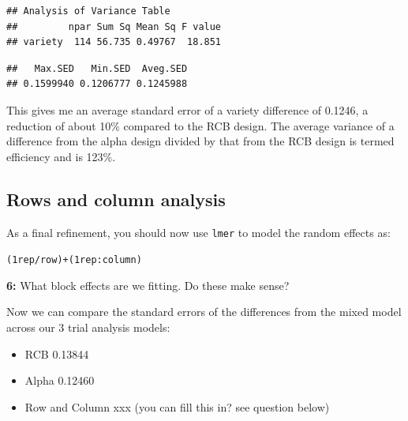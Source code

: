 \documentclass[
]{book}
\makeatletter
\newenvironment{Shaded}{\begin{snugshade}}{\end{snugshade}}
\newcommand{\AttributeTok}[1]{\textcolor[rgb]{0.77,0.63,0.00}{#1}}
\newcommand{\FunctionTok}[1]{\textcolor[rgb]{0.00,0.00,0.00}{#1}}
\newcommand{\NormalTok}[1]{#1}
\newcommand{\OtherTok}[1]{\textcolor[rgb]{0.56,0.35,0.01}{#1}}
\newcommand{\SpecialCharTok}[1]{\textcolor[rgb]{0.00,0.00,0.00}{#1}}
\newcommand{\StringTok}[1]{\textcolor[rgb]{0.31,0.60,0.02}{#1}}
\providecommand{\tightlist}{%
  \setlength{\itemsep}{0pt}\setlength{\parskip}{0pt}}
\newenvironment{kframe}{%
\medskip{}
\setlength{\fboxsep}{.8em}
 \def\at@end@of@kframe{}%
 \ifinner\ifhmode%
  \def\at@end@of@kframe{\end{minipage}}%
  \begin{minipage}{\columnwidth}%
 \fi\fi%
 \def\FrameCommand##1{\hskip\@totalleftmargin \hskip-\fboxsep
 \colorbox{shadecolor}{##1}\hskip-\fboxsep
     \hskip-\linewidth \hskip-\@totalleftmargin \hskip\columnwidth}%
 \MakeFramed {\advance\hsize-\width
   \@totalleftmargin\z@ \linewidth\hsize
   \@setminipage}}%
 {\par\unskip\endMakeFramed%
 \at@end@of@kframe}
\newenvironment{rmdblock}[1]
  {
  \begin{itemize}
  \renewcommand{\labelitemi}{
    \raisebox{-.7\height}[0pt][0pt]{
      {\setkeys{Gin}{width=3em,keepaspectratio}\texttt{[image: images/\#1]}}
    }
  }
  \setlength{\fboxsep}{1em}
  \begin{kframe}
  \item
  }
  {
  \end{kframe}
  \end{itemize}
  }
\newenvironment{rmdquiz}
  {\begin{rmdblock}{quiz}}
  {\end{rmdblock}}
\makeatother
\begin{document}
\begin{verbatim}
## Analysis of Variance Table
##         npar Sum Sq Mean Sq F value
## variety  114 56.735 0.49767  18.851
\end{verbatim}

\begin{Shaded}
\end{Shaded}

\begin{verbatim}
##   Max.SED   Min.SED  Aveg.SED 
## 0.1599940 0.1206777 0.1245988
\end{verbatim}

This gives me an average standard error of a variety difference of 0.1246, a reduction of about 10\% compared to the RCB design. The average variance of a difference from the alpha design divided by that from the RCB design is termed efficiency and is 123\%.

\hypertarget{rows-and-column-analysis}{%
\subsection{Rows and column analysis}\label{rows-and-column-analysis}}

As a final refinement, you should now use \texttt{lmer} to model the random effects as:

\texttt{(1\textbar{}rep/row)+(1\textbar{}rep:column)}

\begin{rmdquiz}
\textbf{6:}
What block effects are we fitting. Do these make sense?
\end{rmdquiz}

Now we can compare the standard errors of the differences from the mixed model across our 3 trial analysis models:

\begin{itemize}
\tightlist
\item
  RCB 0.13844
\item
  Alpha 0.12460
\item
  Row and Column xxx (you can fill this in? see question below)
\end{itemize}
\end{document}
